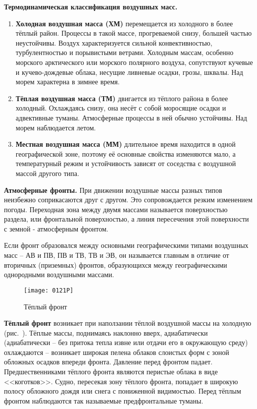 \textbf{Термодинамическая классификация воздушных масс.}
\begin{enumerate}
\item \textbf{Холодная воздушная масса (ХМ)} перемещается из холодного
  в более тёплый район. Процессы в такой массе, прогреваемой снизу,
  большей частью неустойчивы. Воздух характеризуется сильной
  конвективностью, турбулентностью и порывистыми ветрами. Холодным
  массам, особенно морского арктического или морского полярного
  воздуха, сопутствуют кучевые и кучево-дождевые облака, несущие
  ливневые осадки, грозы, шквалы. Над морем характерна в зимнее время.
\item \textbf{Тёплая воздушная масса (ТМ)} двигается из тёплого района
  в более холодный. Охлаждаясь снизу, она несёт с собой моросящие
  осадки и адвективные туманы. Атмосферные процессы в ней обычно
  устойчивы. Над морем наблюдается летом.
\item \textbf{Местная воздушная масса (ММ)} длительное время находится
  в одной географической зоне, поэтому её основные свойства изменяются
  мало, а температурный режим и устойчивость зависят от соседства с
  воздушной массой другого типа.
\end{enumerate}

\textbf{Атмосферные фронты.} При движении
воздушные массы разных типов неизбежно соприкасаются друг с
другом. Это сопровождается резким изменением погоды. Переходная зона
между двумя массами называется поверхностью раздела, или фронтальной
поверхностью, а линия пересечения этой поверхности с земной -
атмосферным фронтом.

Если фронт образовался между основными географическими типами
воздушных масс \--- АВ и ПВ, ПВ и ТВ, ТВ и ЭВ, он называется главным в
отличие от вторичных (приземных) фронтов, образующихся между
географическими однородными воздушными массами.

\begin{figure*}[!htb]
  \centering{}
  \texttt{[image: 0121P]}
  \caption{Тёплый фронт}
  \label{fig:121}
\end{figure*}

\textbf{Тёплый фронт} возникает при наползании
тёплой воздушной массы на холодную (рис.~). Тёплые массы,
поднимаясь наклонно вверх, адиабатически (адиабатически \--- без
притока тепла извне или отдачи его в окружающую среду) охлаждаются
\--- возникает широкая пелена облаков слоистых форм с зоной обложных
осадков впереди фронта. Давление перед фронтом
падает. Предшественниками тёплого фронта являются перистые облака в
виде <<коготков>>. Судно, пересекая зону тёплого фронта, попадает в
широкую полосу обложного дождя или снега с пониженной
видимостью. Перед тёплым фронтом наблюдаются так называемые
предфронтальные туманы.

